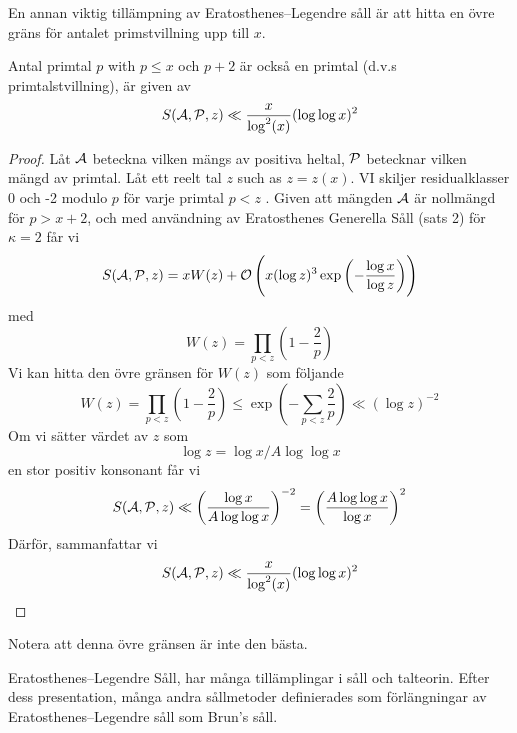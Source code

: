 En annan viktig tillämpning av Eratosthenes–Legendre såll är att hitta en övre gräns för antalet primstvillning upp till $ x $.
\begin{theorem}\hfill

Antal primtal $ p $ with $ p\leq x $ och $ p+2 $ är också en primtal (d.v.s primtalstvillning), är given av
\[\S\A\P z \ll\frac{x}{\log^{2}(x)}(\log\log x)^{2}\]
\end{theorem}
\begin{proof}
Låt $ \A $ beteckna vilken mängs av positiva heltal, $ \P $ betecknar vilken mängd av primtal. Låt ett reelt tal $ z $ such as $ z=z(x) $. VI skiljer residualklasser 0 och -2 modulo $ p $ för varje primtal $ p<z $ . Given att mängden $ \A $ är nollmängd för $ p>x+2 $, och med användning av Eratosthenes Generella Såll (sats 2) för $ \kappa=2 $ får vi
\[\S\A\P z = xW(z)+\mathcal{O} \left( x(\log z)^{3} \exp \left( -\frac{\log x}{\log z}\right) \right)\]
med
\[W(z)=\prod_{p<z}\left( 1-\frac{2}{p}\right)\]
Vi kan hitta den övre gränsen för $ W(z) $ som följande
\[W(z)=\prod_{p<z}\left( 1-\frac{2}{p}\right)\leq\exp \left( -\sum_{p<z}\frac{2}{p} \right)\ll (\log z)^{-2}\]
Om vi sätter värdet av $ z $ som
\[\log z = \log x/A\log\log x\]en stor positiv konsonant
får vi  
\[\S\A\P z \ll \left( \frac{\log x}{A\log\log x} \right)^{-2}=\left( \frac{A\log\log x}{\log x} \right)^{2}\]
Därför, sammanfattar vi
\[\S\A\P z \ll\frac{x}{\log^{2}(x)}(\log\log x)^{2}\]
\end{proof}
Notera att denna övre gränsen är inte den bästa. 
 


Eratosthenes–Legendre Såll, har många tillämplingar i såll och talteorin. Efter dess presentation, många andra sållmetoder definierades som förlängningar av Eratosthenes–Legendre såll som Brun's såll.









